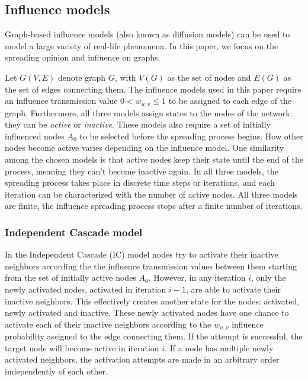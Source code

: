 \documentclass[pdflatex,sn-mathphys-ay]{sn-jnl}
\begin{document}

\subsection{Influence models}\label{subsec_infmodels}

Graph-based influence models (also known as diffusion models) can be used to model a large variety of real-life phenomena. In this paper, we focus on the spreading opinion and influence on graphs.

Let $G(V,E)$ denote graph $G$, with $V(G)$ as the set of nodes and $E(G)$ as the set of edges connecting them. The influence models used in this paper require an influence transmission value $0 < w_{u,v} \leq 1$ to be assigned to each edge of the graph. Furthermore, all three models assign states to the nodes of the network: they can be {\em active} or {\em inactive}. These models also require a set of initially influenced nodes $A_0$ to be selected before the spreading process begins. How other nodes become active varies depending on the influence model. One similarity among the chosen models is that active nodes keep their state until the end of the process, meaning they can't become inactive again. In all three models, the spreading process takes place in discrete time steps or iterations, and each iteration can be characterized with the number of active nodes. All three models are finite, the influence spreading process stops after a finite number of iterations.


\subsubsection{Independent Cascade model}

In the Independent Cascade (IC) model \citep{kempe} nodes try to activate their inactive neighbors according the the influence transmission values between them starting from the set of initially active nodes $A_0$. However, in any iteration $i$, only the newly activated nodes, activated in iteration $i-1$, are able to activate their inactive neighbors. This effectively creates another state for the nodes: activated, newly activated and inactive. These newly activated nodes have one chance to activate each of their inactive neighbors according to the $w_{u,v}$ influence probability assigned to the edge connecting them. If the attempt is successful, the target node will become active in iteration $i$. If a node has multiple newly activated neighbors, the activation attempts are made in an arbitrary order independently of each other.
\end{document}

